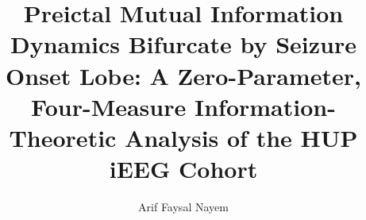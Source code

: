 \documentclass[final,5p,times,twocolumn]{elsarticle}
\begin{document}
\linenumbers

\begin{frontmatter}

\title{Preictal Mutual Information Dynamics Bifurcate by Seizure Onset
       Lobe: A Zero-Parameter, Four-Measure Information-Theoretic
       Analysis of the HUP iEEG Cohort}

\author[aff1]{Arif Faysal Nayem}



\end{frontmatter}
\end{document}
